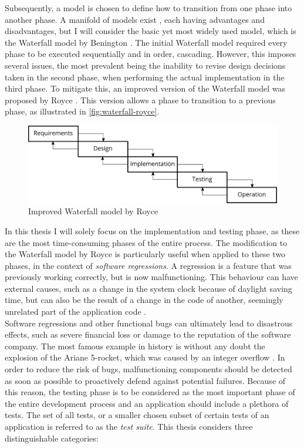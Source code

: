 \noindent Subsequently, a model is chosen to define how to transition from one phase into another phase. A manifold of models exist \cite{2010govardhan}, each having advantages and disadvantages, but I will consider the basic yet most widely used model, which is the Waterfall model by Benington \cite{united1956symposium}. The initial Waterfall model required every phase to be executed sequentially and in order, cascading. However, this imposes several issues, the most prevalent being the inability to revise design decisions taken in the second phase, when performing the actual implementation in the third phase. To mitigate this, an improved version of the Waterfall model was proposed by Royce \cite{Royce:1987:MDL:41765.41801}. This version allows a phase to transition to a previous phase, as illustrated in \autoref{fig:waterfall-royce}.

\begin{figure}[htbp!]
	\centering
	\includegraphics[width=\textwidth]{assets/sdlc.pdf}
	\caption{Improved Waterfall model by Royce}
	\label{fig:waterfall-royce}
\end{figure}

\noindent In this thesis I will solely focus on the implementation and testing phase, as these are the most time-consuming phases of the entire process. The modification to the Waterfall model by Royce is particularly useful when applied to these two phases, in the context of \emph{software regressions}. A regression \cite{10.1007/978-3-540-77966-7_18} is a feature that was previously working correctly, but is now malfunctioning. This behaviour can have external causes, such as a change in the system clock because of daylight saving time, but can also be the result of a change in the code of another, seemingly unrelated part of the application code \cite{6588537}.\\

\noindent Software regressions and other functional bugs can ultimately lead to disastrous effects, such as severe financial loss or damage to the reputation of the software company. The most famous example in history is without any doubt the explosion of the Ariane 5-rocket, which was caused by an integer overflow \cite{581900}. In order to reduce the risk of bugs, malfunctioning components should be detected as soon as possible to proactively defend against potential failures. Because of this reason, the testing phase is to be considered as the most important phase of the entire development process and an application should include a plethora of tests. The set of all tests, or a smaller chosen subset of certain tests of an application is referred to as the \emph{test suite}. This thesis considers three distinguishable categories:

